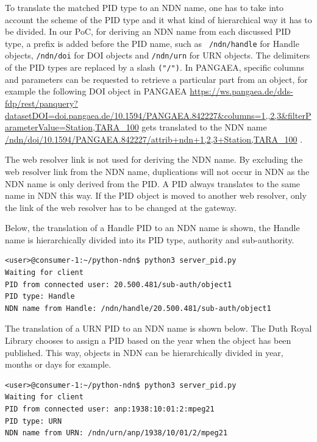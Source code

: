 To translate the matched PID type to an NDN name, one has to take into account the scheme of the PID type and it 
what kind of hierarchical way 
it has to be divided. In our PoC, for deriving an NDN name from each discussed PID type, a prefix is added before the PID name, such as \texttt{
/ndn/handle} for Handle objects, \texttt{/ndn/doi} for DOI objects and \texttt{/ndn/urn} for URN objects. The delimiters 
of the PID types are replaced by a slash \texttt{("/")}. In PANGAEA, specific
columns and parameters can be requested  to retrieve a particular part from an object, for example the following DOI object in PANGAEA \url{https://ws.pangaea.de/dds-fdp/rest/panquery?datasetDOI=doi.pangaea.de/10.1594/PANGAEA.842227&columns=1,,2,3&filterParameterValue=Station,TARA_100} gets translated to the NDN name \url{/ndn/doi/10.1594/PANGAEA.842227/attrib+ndn+1,2,3+Station,TARA_100} \cite{ndn-app-aware}. 

The web resolver link is not used for deriving the NDN name.
By excluding the web resolver link from the NDN name, duplications will not occur in NDN as the NDN name is only derived from the PID. A PID always translates to the same name in NDN this way. 
If the PID object is moved to another web resolver, only the link of the web resolver has to be changed at the gateway. 

Below, the translation of a Handle PID to an NDN name is shown, the Handle name is hierarchically divided into its PID type, authority and sub-authority.
\vspace{1em}
\begin{lstlisting}[frame=single,gobble=0,basicstyle=\scriptsize\ttfamily]
<user>@consumer-1:~/python-ndn$ python3 server_pid.py
Waiting for client
PID from connected user: 20.500.481/sub-auth/object1
PID type: Handle
NDN name from Handle: /ndn/handle/20.500.481/sub-auth/object1
\end{lstlisting}

The translation of a URN PID to an NDN name is shown below. The Duth Royal Library chooses to assign a PID based on the year when the object has been published. 
This way, objects in NDN can be hierarchically divided in year, months or days for example.
\vspace{1em}
\begin{lstlisting}[frame=single,gobble=0,basicstyle=\scriptsize\ttfamily]
<user>@consumer-1:~/python-ndn$ python3 server_pid.py
Waiting for client
PID from connected user: anp:1938:10:01:2:mpeg21
PID type: URN
NDN name from URN: /ndn/urn/anp/1938/10/01/2/mpeg21
\end{lstlisting}

